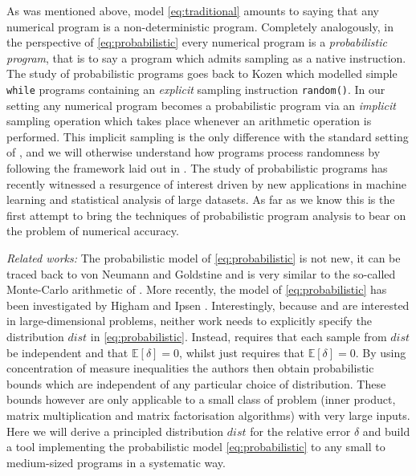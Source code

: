 \documentclass[10pt,conference]{IEEEtran}
\newcommand{\Exp}[1]{\mathbb{E}\left[#1\right]}
\begin{document}
As was mentioned above, model \eqref{eq:traditional} amounts to saying that any numerical program is a non-deterministic program. Completely analogously, in the perspective of \cref{eq:probabilistic} every numerical program is a \emph{probabilistic program}, that is to say a program which admits sampling as a native instruction. The study of probabilistic programs goes back to Kozen \cite{K81c} which modelled simple \texttt{while} programs containing an \emph{explicit} sampling instruction \texttt{random()}. In our setting any numerical program becomes a probabilistic program via an \emph{implicit} sampling operation which takes place whenever an arithmetic operation is performed. This implicit sampling is the only difference with the standard setting of \cite{K81c}, and we will otherwise understand how programs process randomness by following the framework laid out in \cite{K81c}. The study of probabilistic programs has recently witnessed a resurgence of interest driven by new applications in machine learning and statistical analysis of large datasets. As far as we know this is the first attempt to bring the techniques of probabilistic program analysis to bear on the problem of numerical accuracy.

\emph{Related works: }
The probabilistic model of \cref{eq:probabilistic} is not new, it can be traced back to von Neumann and Goldstine \cite{von1947numerical} and is very similar to the so-called Monte-Carlo arithmetic of \cite{parker1997monte}.
 More recently, the model of \cref{eq:probabilistic} has been investigated by Higham \cite{higham2019new}
and Ipsen \cite{ipsen2019probabilistic}. Interestingly, because \cite{higham2019new} and \cite{ipsen2019probabilistic} are interested in large-dimensional problems, neither work needs to explicitly specify the distribution $dist$ in \cref{eq:probabilistic}. Instead, \cite{higham2019new} requires that each sample from $dist$ be independent and that $\Exp{\delta}=0$, whilst \cite{ipsen2019probabilistic} just requires that $\Exp{\delta}=0$. By using concentration of measure inequalities the authors then obtain probabilistic bounds which are independent of any particular choice of distribution. 
These bounds however are only applicable to a small class of problem (inner product, matrix multiplication and matrix factorisation algorithms) with very large inputs. Here we will derive a principled distribution $dist$ for the relative error $\delta$ and build a tool implementing the probabilistic model \cref{eq:probabilistic} to any small to medium-sized programs in a systematic way.
\end{document}
